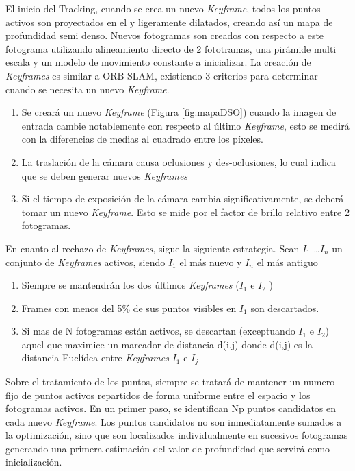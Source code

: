 El inicio del Tracking, cuando se crea un nuevo \textit{Keyframe}, todos los puntos activos son proyectados en el y ligeramente dilatados, creando así un mapa de profundidad semi denso. Nuevos fotogramas son creados con respecto a este fotograma utilizando alineamiento directo de 2 fototramas, una pirámide multi escala y un modelo de movimiento constante a inicializar. 
La creación de \textit{Keyframes} es similar a ORB-SLAM, existiendo 3 criterios para determinar cuando se necesita un nuevo \textit{Keyframe}.
\begin {enumerate}
\item Se creará un nuevo \textit{Keyframe} (Figura \ref{fig:mapaDSO}) cuando la imagen de entrada cambie notablemente con respecto al último \textit{Keyframe}, esto se medirá con la diferencias de medias al cuadrado entre los píxeles.
\item La traslación de la cámara causa oclusiones y des-oclusiones, lo cual indica que se deben generar nuevos \textit{Keyframes}
\item Si el tiempo de exposición de la cámara cambia significativamente, se deberá tomar un nuevo \textit{Keyframe}. Esto se mide por el factor de brillo relativo entre 2 fotogramas. 
\end {enumerate}

En cuanto al rechazo de \textit{Keyframes}, sigue la siguiente estrategia. Sean $I_1$ \dots $I_n$ un conjunto de \textit{Keyframes} activos, siendo $I_1$ el más nuevo y $I_n$ el más antiguo
\begin {enumerate}
\item Siempre se mantendrán los dos últimos \textit{Keyframes} ($I_1$  e $I_2$ )
\item Frames con menos del 5\% de sus puntos visibles en $I_1$  son descartados.
\item Si mas de N fotogramas están activos, se descartan (exceptuando $I_1$  e $I_2$) aquel que maximice un marcador de distancia d(i,j) donde d(i,j) es la distancia Euclídea entre \textit{Keyframes} $I_1$  e $I_j$
\end {enumerate}

Sobre el tratamiento de los puntos, siempre se tratará de mantener un numero fijo de puntos activos repartidos de forma uniforme entre el espacio y los fotogramas activos. En un primer paso, se identifican Np puntos candidatos en cada nuevo \textit{Keyframe}. Los puntos candidatos no son inmediatamente sumados a la optimización, sino que son localizados individualmente en sucesivos fotogramas generando una primera estimación del valor de profundidad que servirá como inicialización. 

